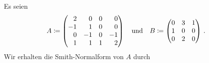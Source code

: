 \section{}



\addtocounter{subsection}{1}



\subsection{}

Es seien
\[
            A
  \defined  \begin{pmatrix*}[r]
               2  &  0  & 0 &  0  \\
              -1  &  1  & 0 &  0  \\
               0  & -1  & 0 & -1  \\
               1  &  1  & 1 &  2
            \end{pmatrix*}
  \quad\text{und}\quad
            B
  \defined  \begin{pmatrix*}[r]
              0 & 3 & 1 \\
              1 & 0 & 0 \\
              0 & 2 & 0
            \end{pmatrix*} \,.
\]
Wir erhalten die Smith-Normalform von $A$ durch
